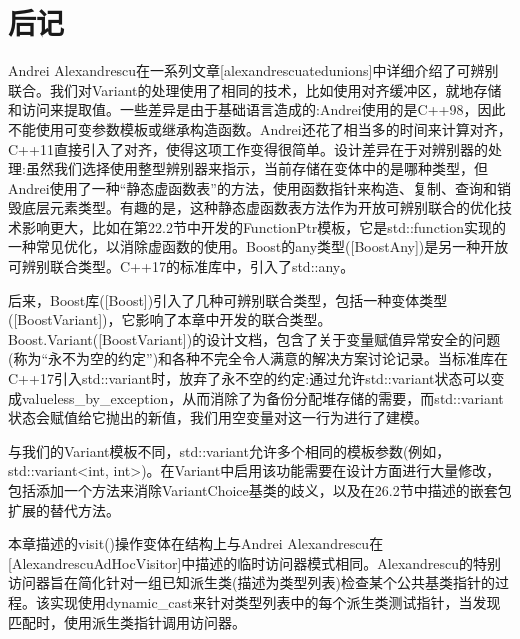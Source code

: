 \section{后记}
Andrei Alexandrescu在一系列文章[alexandrescuatedunions]中详细介绍了可辨别联合。我们对Variant的处理使用了相同的技术，比如使用对齐缓冲区，就地存储和访问来提取值。一些差异是由于基础语言造成的:Andrei使用的是C++98，因此不能使用可变参数模板或继承构造函数。Andrei还花了相当多的时间来计算对齐，C++11直接引入了对齐，使得这项工作变得很简单。设计差异在于对辨别器的处理:虽然我们选择使用整型辨别器来指示，当前存储在变体中的是哪种类型，但Andrei使用了一种“静态虚函数表”的方法，使用函数指针来构造、复制、查询和销毁底层元素类型。有趣的是，这种静态虚函数表方法作为开放可辨别联合的优化技术影响更大，比如在第22.2节中开发的FunctionPtr模板，它是std::function实现的一种常见优化，以消除虚函数的使用。Boost的any类型([BoostAny])是另一种开放可辨别联合类型。C++17的标准库中，引入了std::any。

后来，Boost库([Boost])引入了几种可辨别联合类型，包括一种变体类型([BoostVariant])，它影响了本章中开发的联合类型。Boost.Variant([BoostVariant])的设计文档，包含了关于变量赋值异常安全的问题(称为“永不为空的约定”)和各种不完全令人满意的解决方案讨论记录。当标准库在C++17引入std::variant时，放弃了永不空的约定:通过允许std::variant状态可以变成valueless\_by\_exception，从而消除了为备份分配堆存储的需要，而std::variant状态会赋值给它抛出的新值，我们用空变量对这一行为进行了建模。

与我们的Variant模板不同，std::variant允许多个相同的模板参数(例如，std::variant<int, int>)。在Variant中启用该功能需要在设计方面进行大量修改，包括添加一个方法来消除VariantChoice基类的歧义，以及在26.2节中描述的嵌套包扩展的替代方法。

本章描述的visit()操作变体在结构上与Andrei Alexandrescu在[AlexandrescuAdHocVisitor]中描述的临时访问器模式相同。Alexandrescu的特别访问器旨在简化针对一组已知派生类(描述为类型列表)检查某个公共基类指针的过程。该实现使用dynamic\_cast来针对类型列表中的每个派生类测试指针，当发现匹配时，使用派生类指针调用访问器。



